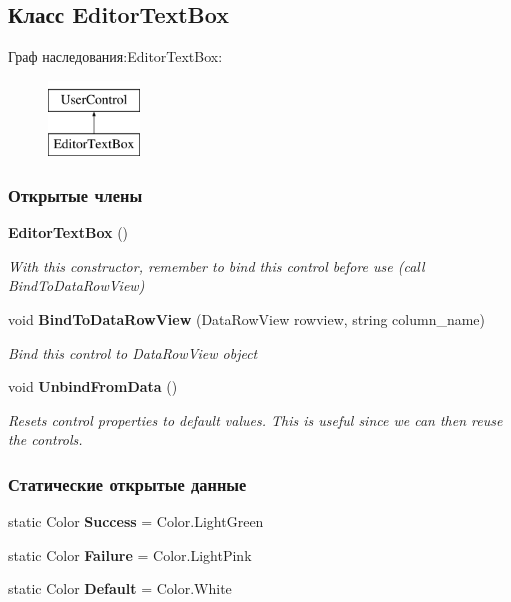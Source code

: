 \subsection{Класс Editor\+Text\+Box}
\label{classkdz__manager_1_1_editor_text_box}
Граф наследования\+:Editor\+Text\+Box\+:\begin{figure}[H]
\begin{center}
\leavevmode
\includegraphics[height=2.000000cm]{classkdz__manager_1_1_editor_text_box}
\end{center}
\end{figure}
\subsubsection*{Открытые члены}
\begin{DoxyCompactItemize}
\item 
{\bf Editor\+Text\+Box} ()
\begin{DoxyCompactList}\small\item\em With this constructor, remember to bind this control before use (call Bind\+To\+Data\+Row\+View) \end{DoxyCompactList}\item 
void {\bf Bind\+To\+Data\+Row\+View} (Data\+Row\+View rowview, string column\+\_\+name)
\begin{DoxyCompactList}\small\item\em Bind this control to Data\+Row\+View object \end{DoxyCompactList}\item 
void {\bf Unbind\+From\+Data} ()
\begin{DoxyCompactList}\small\item\em Resets control properties to default values. This is useful since we can then reuse the controls. \end{DoxyCompactList}\end{DoxyCompactItemize}
\subsubsection*{Статические открытые данные}
\begin{DoxyCompactItemize}
\item 
static Color {\bfseries Success} = Color.\+Light\+Green\label{classkdz__manager_1_1_editor_text_box_a412e64ff5e03578f96baf3d42ca7cc47}

\item 
static Color {\bfseries Failure} = Color.\+Light\+Pink\label{classkdz__manager_1_1_editor_text_box_a66daee56c8498eb96286ff892b941f20}

\item 
static Color {\bfseries Default} = Color.\+White\label{classkdz__manager_1_1_editor_text_box_ae9f7469c1ac140130f288a9a2a417409}

\end{DoxyCompactItemize}
